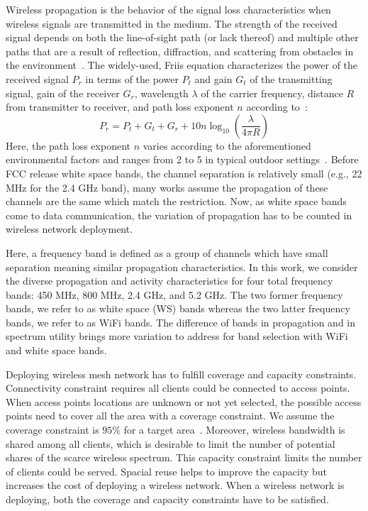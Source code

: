 Wireless propagation is the behavior of the signal loss characteristics 
when wireless signals are transmitted in the medium.
The strength of the received signal depends on both the line-of-sight
path (or lack thereof) and multiple other paths that are a result of 
reflection, diffraction, and scattering from obstacles in the 
environment~\cite{andersen1995propagation}. The widely-used, Friis
equation characterizes the power of the received signal $P_r$ in terms 
of the power $P_t$ and gain $G_t$ of the transmitting signal, gain of 
the receiver $G_r$, wavelength $\lambda$ of the carrier frequency, 
distance $R$ from transmitter to receiver, and path loss exponent $n$ according 
to~\cite{friis}:
\begin{equation}
\label{eq:friis}
P_r=P_t+G_t+G_r+10n \log_{10}\left( \frac{\lambda}{4\pi R}\right)
\end{equation}
Here, the path loss exponent $n$ varies according to the
aforementioned environmental factors and ranges from 2 to 5 in typical
outdoor settings~\cite{rappaport}.
Before FCC release white space bands, the channel separation is relatively 
small (e.g., 22 MHz for the 2.4 GHz band), many works assume the propagation 
of these channels are the same which match the restriction. 
Now, as white space bands come to data communication, the variation of
propagation has to be counted in wireless network deployment.

Here, a frequency band is defined as a group of channels which have
small separation meaning similar propagation characteristics.
In this work, we consider the diverse propagation and activity characteristics
for four total frequency bands: 450 MHz, 800 MHz, 2.4 GHz, and 5.2 GHz.
The two former frequency bands, we refer to as white space (WS) bands whereas
the two latter frequency bands, we refer to as WiFi bands.
The difference of bands in propagation and in spectrum utility brings 
more variation to address for band selection with WiFi and white space bands.

Deploying wireless mesh network has to fulfill coverage and capacity constraints. 
Connectivity constraint requires all clients could be connected to access points.
When access points locations are unknown or not yet selected, the possible access points
 need to cover all the area with a coverage constraint. We assume the coverage
constraint is $95\%$ for a target area~\cite{robinson2010deploying}. 
Moreover, wireless bandwidth is shared among all clients, which is desirable to 
limit the number of potential shares of the scarce wireless spectrum. This capacity constraint
limits the number of clients could be served. 
Spacial reuse helps to improve the capacity but increases the cost of deploying a wireless 
network. When a wireless network is deploying, both the coverage and capacity constraints have to 
be satisfied.

